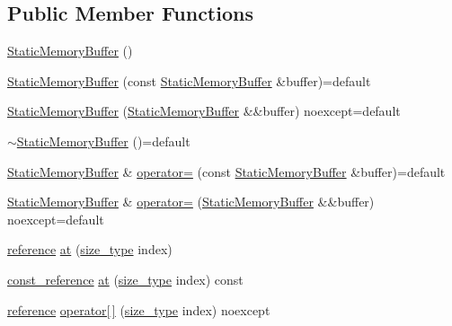 \subsection*{Public Member Functions}
\begin{DoxyCompactItemize}
\item 
\mbox{\hyperlink{classmage_1_1_static_memory_buffer_a15bf3d201824c9695a36297c40e01a06}{Static\+Memory\+Buffer}} ()
\item 
\mbox{\hyperlink{classmage_1_1_static_memory_buffer_aba8752d8d72ee864a16b9327df70ae1d}{Static\+Memory\+Buffer}} (const \mbox{\hyperlink{classmage_1_1_static_memory_buffer}{Static\+Memory\+Buffer}} \&buffer)=default
\item 
\mbox{\hyperlink{classmage_1_1_static_memory_buffer_ad21c24f87cffd099b9f0fc9325747624}{Static\+Memory\+Buffer}} (\mbox{\hyperlink{classmage_1_1_static_memory_buffer}{Static\+Memory\+Buffer}} \&\&buffer) noexcept=default
\item 
\mbox{\hyperlink{classmage_1_1_static_memory_buffer_abcb2394fef59fbe220494cf178df4622}{$\sim$\+Static\+Memory\+Buffer}} ()=default
\item 
\mbox{\hyperlink{classmage_1_1_static_memory_buffer}{Static\+Memory\+Buffer}} \& \mbox{\hyperlink{classmage_1_1_static_memory_buffer_a3befe8a825c142f72ee79759da900902}{operator=}} (const \mbox{\hyperlink{classmage_1_1_static_memory_buffer}{Static\+Memory\+Buffer}} \&buffer)=default
\item 
\mbox{\hyperlink{classmage_1_1_static_memory_buffer}{Static\+Memory\+Buffer}} \& \mbox{\hyperlink{classmage_1_1_static_memory_buffer_a560aa20cc2f553eccf2b8861e211efc5}{operator=}} (\mbox{\hyperlink{classmage_1_1_static_memory_buffer}{Static\+Memory\+Buffer}} \&\&buffer) noexcept=default
\item 
\mbox{\hyperlink{classmage_1_1_static_memory_buffer_ac00b0718b8b57bcaee2a7904637fc031}{reference}} \mbox{\hyperlink{classmage_1_1_static_memory_buffer_a94a0114dc24b98034db44437eea73558}{at}} (\mbox{\hyperlink{classmage_1_1_static_memory_buffer_a13e19b7af61a49400c5be360f09aadc8}{size\+\_\+type}} index)
\item 
\mbox{\hyperlink{classmage_1_1_static_memory_buffer_a2d961d7baf56ebc96e1e48579bcdcb84}{const\+\_\+reference}} \mbox{\hyperlink{classmage_1_1_static_memory_buffer_a64c3d250df05a1b205d813e86c123dcd}{at}} (\mbox{\hyperlink{classmage_1_1_static_memory_buffer_a13e19b7af61a49400c5be360f09aadc8}{size\+\_\+type}} index) const
\item 
\mbox{\hyperlink{classmage_1_1_static_memory_buffer_ac00b0718b8b57bcaee2a7904637fc031}{reference}} \mbox{\hyperlink{classmage_1_1_static_memory_buffer_aeb41deead4aa38fa6f7203d78fdadfaf}{operator\mbox{[}$\,$\mbox{]}}} (\mbox{\hyperlink{classmage_1_1_static_memory_buffer_a13e19b7af61a49400c5be360f09aadc8}{size\+\_\+type}} index) noexcept

\end{DoxyCompactItemize}
